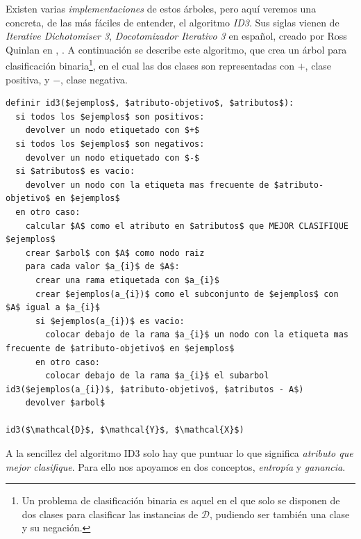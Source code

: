 Existen varias \emph{implementaciones} de estos árboles, pero aquí veremos una concreta, de las más fáciles de entender, el algoritmo \emph{ID3}. Sus siglas vienen de \emph{Iterative Dichotomiser 3}, \emph{Docotomizador Iterativo 3} en español, creado por Ross Quinlan en \citeyear{quinlan1986induction}, \cite{quinlan1986induction}. A continuación se describe este algoritmo, que crea un árbol para clasificación binaria\footnote{Un problema de clasificación binaria es aquel en el que solo se disponen de dos clases para clasificar las instancias de $\mathcal{D}$, pudiendo ser también una clase y su negación.}, en el cual las dos clases son representadas con $+$, clase positiva, y $-$, clase negativa.

\vspace*{3mm}
\lstset{style=pseudocode}
\begin{lstlisting}
definir id3($ejemplos$, $atributo-objetivo$, $atributos$):
  si todos los $ejemplos$ son positivos:
    devolver un nodo etiquetado con $+$
  si todos los $ejemplos$ son negativos:
    devolver un nodo etiquetado con $-$
  si $atributos$ es vacio:
    devolver un nodo con la etiqueta mas frecuente de $atributo-objetivo$ en $ejemplos$
  en otro caso:
    calcular $A$ como el atributo en $atributos$ que MEJOR CLASIFIQUE $ejemplos$
    crear $arbol$ con $A$ como nodo raiz
    para cada valor $a_{i}$ de $A$:
      crear una rama etiquetada con $a_{i}$
      crear $ejemplos(a_{i})$ como el subconjunto de $ejemplos$ con $A$ igual a $a_{i}$
      si $ejemplos(a_{i})$ es vacio:
        colocar debajo de la rama $a_{i}$ un nodo con la etiqueta mas frecuente de $atributo-objetivo$ en $ejemplos$
      en otro caso:
        colocar debajo de la rama $a_{i}$ el subarbol id3($ejemplos(a_{i})$, $atributo-objetivo$, $atributos - A$)
    devolver $arbol$

id3($\mathcal{D}$, $\mathcal{Y}$, $\mathcal{X}$)
\end{lstlisting}

A la sencillez del algoritmo ID3 solo hay que puntuar lo que significa \emph{atributo que mejor clasifique}. Para ello nos apoyamos en dos conceptos, \emph{entropía} y \emph{ganancia}.

